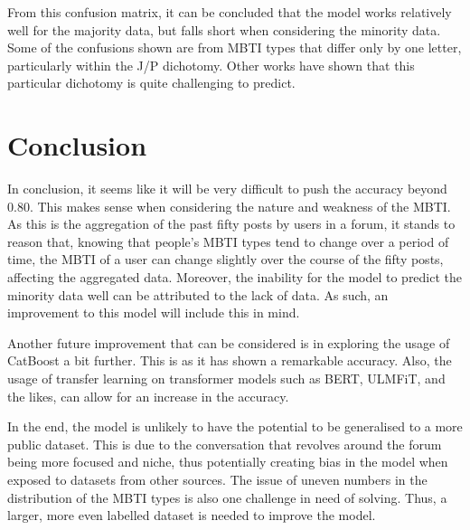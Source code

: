 \documentclass[11pt,a4paper]{article}
\begin{document}
	From this confusion matrix, it can be concluded that the model works relatively well for the majority data, but falls short when considering the minority data. Some of the confusions shown are from MBTI types that differ only by one letter, particularly within the J/P dichotomy.\autocite{choongPredictingJudgingperceivingMyersBriggs2021} Other works have shown that this particular dichotomy is quite challenging to predict.
	
	\section{Conclusion}
	
	In conclusion, it seems like it will be very difficult to push the accuracy beyond 0.80. This makes sense when considering the nature and weakness of the MBTI. As this is the aggregation of the past fifty posts by users in a forum, it stands to reason that, knowing that people's MBTI types tend to change over a period of time, the MBTI of a user can change slightly over the course of the fifty posts, affecting the aggregated data. Moreover, the inability for the model to predict the minority data well can be attributed to the lack of data. As such, an improvement to this model will include this in mind.
	
	Another future improvement that can be considered is in exploring the usage of CatBoost a bit further. This is as it has shown a remarkable accuracy. Also, the usage of transfer learning on transformer models such as BERT, ULMFiT, and the likes, can allow for an increase in the accuracy.
	
	In the end, the model is unlikely to have the potential to be generalised to a more public dataset. This is due to the conversation that revolves around the forum being more focused and niche, thus potentially creating bias in the model when exposed to datasets from other sources.\autocite{choongPredictingJudgingperceivingMyersBriggs2021} The issue of uneven numbers in the distribution of the MBTI types is also one challenge in need of solving. Thus, a larger, more even labelled dataset is needed to improve the model.
\end{document}

